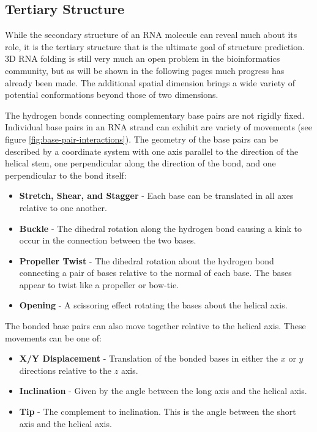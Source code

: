 \documentclass[journal]{IEEEtran}
\begin{document}
\subsection{Tertiary Structure}
\label{subsec:intro-rna-ter-structure}
While the secondary structure of an RNA molecule can reveal much about its role, it is the tertiary structure that is the ultimate goal of structure prediction. 3D RNA folding is still very much an open problem in the bioinformatics community, but as will be shown in the following pages much progress has already been made. The additional spatial dimension brings a wide variety of potential conformations beyond those of two dimensions.

The hydrogen bonds connecting complementary base pairs are not rigidly fixed. Individual base pairs in an RNA strand can exhibit are variety of movements (see figure \ref{fig:base-pair-interactions}). The geometry of the base pairs can be described by a coordinate system with one axis parallel to the direction of the helical stem, one perpendicular along the direction of the bond, and one perpendicular to the bond itself:

\begin{itemize}
	\item \textbf{Stretch, Shear, and Stagger} - Each base can be translated in all axes relative to one another.

	\item \textbf{Buckle} - The dihedral rotation along the hydrogen bond causing a kink to occur in the connection between the two bases.

	\item \textbf{Propeller Twist} - The dihedral rotation about the hydrogen bond connecting a pair of bases relative to the normal of each base. The bases appear to twist like a propeller or bow-tie.
	\item \textbf{Opening} - A scissoring effect rotating the bases about the helical axis.
\end{itemize}

The bonded base pairs can also move together relative to the helical axis. These movements can be one of:

\begin{itemize}
	\item \textbf{X/Y Displacement} - Translation of the bonded bases in either the $x$ or $y$ directions relative to the $z$ axis.
	\item \textbf{Inclination} - Given by the angle between the long axis and the helical axis.
	\item \textbf{Tip} - The complement to inclination. This is the angle between the short axis and the helical axis. 
\end{itemize}
\end{document}
